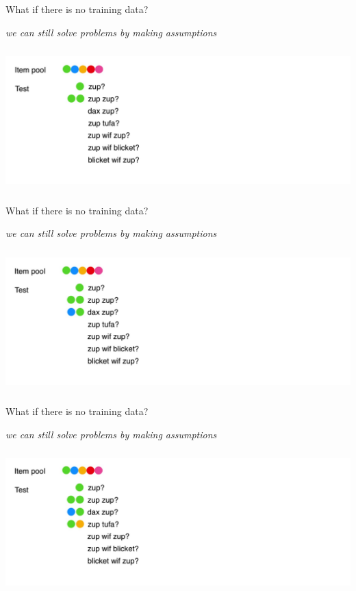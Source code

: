 \begin{frame}{What if there is no training data?}
\centerline{\textit{we can still solve problems by making assumptions}}
\centering\includegraphics[height=5.5cm]{image/img191448.jpg}

\end{frame}

\begin{frame}{What if there is no training data?}
\centerline{\textit{we can still solve problems by making assumptions}}
\centering\includegraphics[height=5.5cm]{image/img191531.jpg}

\end{frame}

\begin{frame}{What if there is no training data?}
\centerline{\textit{we can still solve problems by making assumptions}}
\centering\includegraphics[height=5.5cm]{image/img192202.jpg}

\end{frame}

